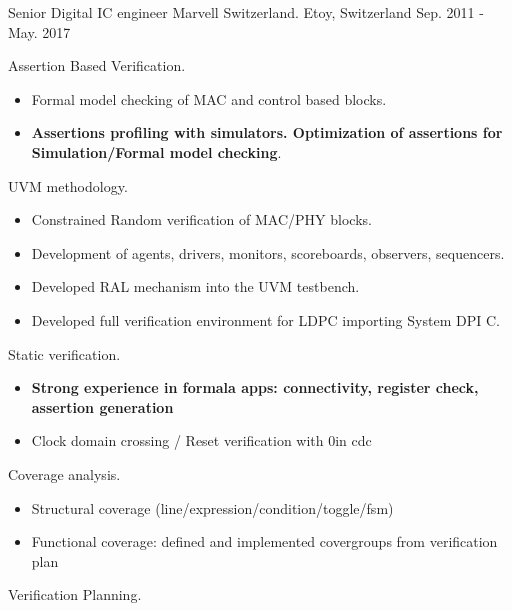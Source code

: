 \begin{cventries}
  \cventry
    {Senior Digital IC engineer} %
    {Marvell Switzerland.} %
    {Etoy, Switzerland} %
    {Sep. 2011 - May. 2017} %
    {
      \begin{cvitems} %
        \item {Assertion Based Verification.}
        \begin{itemize}
          \item {Formal model checking of MAC and control based blocks.}
          \item {\textbf{Assertions profiling with simulators. Optimization of assertions for Simulation/Formal model checking}.}
        \end{itemize}
        \item {UVM methodology.}
        \begin{itemize}
          \item {Constrained Random verification of MAC/PHY blocks.}
          \item {Development of agents, drivers, monitors, scoreboards, observers, sequencers.}
          \item {Developed RAL mechanism into the UVM testbench.}
          \item {Developed full verification environment for LDPC importing System DPI C.}
        \end{itemize}
        \item {Static verification.}
        \begin{itemize}
          \item {\textbf{Strong experience in formala apps: connectivity, register check, assertion generation}}
          \item {Clock domain crossing / Reset verification with 0in cdc}
        \end{itemize}
        \item {Coverage analysis.}
        \begin{itemize}
          \item {Structural coverage (line/expression/condition/toggle/fsm)}
          \item {Functional coverage: defined and implemented covergroups from verification plan}
        \end{itemize}
        \item {Verification Planning.}
        \begin{itemize}

\end{itemize}
\end{cvitems}}
\end{cventries}
